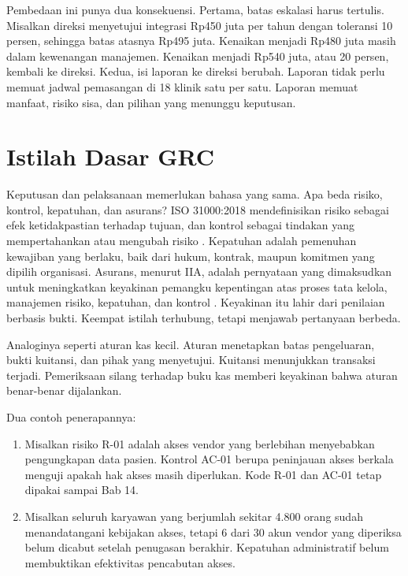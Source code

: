 Pembedaan ini punya dua konsekuensi. Pertama, batas eskalasi harus tertulis. Misalkan
direksi menyetujui integrasi Rp450 juta per tahun dengan toleransi 10 persen, sehingga batas
atasnya Rp495 juta. Kenaikan menjadi Rp480 juta masih dalam kewenangan manajemen. Kenaikan
menjadi Rp540 juta, atau 20 persen, kembali ke direksi. Kedua, isi laporan ke direksi
berubah. Laporan tidak perlu memuat jadwal pemasangan di 18 klinik satu per satu. Laporan
memuat manfaat, risiko sisa, dan pilihan yang menunggu keputusan.

\section{Istilah Dasar GRC}

Keputusan dan pelaksanaan memerlukan bahasa yang sama. Apa beda risiko, kontrol, kepatuhan,
dan asurans? ISO 31000:2018 mendefinisikan risiko sebagai efek ketidakpastian terhadap tujuan, dan
kontrol sebagai tindakan yang mempertahankan atau mengubah risiko \cite{iso31000-2018}.
Kepatuhan adalah pemenuhan kewajiban yang berlaku, baik dari hukum, kontrak, maupun
komitmen yang dipilih organisasi. Asurans, menurut IIA, adalah pernyataan yang dimaksudkan
untuk meningkatkan keyakinan pemangku kepentingan atas proses tata kelola, manajemen
risiko, kepatuhan, dan kontrol \cite{iia-tlm2026}. Keyakinan itu lahir dari penilaian
berbasis bukti. Keempat istilah terhubung, tetapi menjawab pertanyaan berbeda.

Analoginya seperti aturan kas kecil. Aturan menetapkan batas pengeluaran, bukti kuitansi,
dan pihak yang menyetujui. Kuitansi menunjukkan transaksi terjadi. Pemeriksaan silang
terhadap buku kas memberi keyakinan bahwa aturan benar-benar dijalankan.

Dua contoh penerapannya:
\begin{enumerate}
  \item Misalkan risiko R-01 adalah akses vendor yang berlebihan menyebabkan
  pengungkapan data pasien. Kontrol AC-01 berupa peninjauan akses berkala menguji apakah
  hak akses masih diperlukan. Kode R-01 dan AC-01 tetap dipakai sampai Bab 14.
  \item Misalkan seluruh karyawan yang berjumlah sekitar 4.800 orang sudah menandatangani
  kebijakan akses, tetapi 6 dari 30 akun vendor yang diperiksa belum dicabut setelah
  penugasan berakhir. Kepatuhan administratif belum membuktikan efektivitas pencabutan
  akses.
\end{enumerate}

